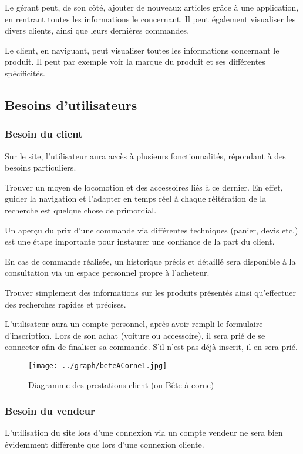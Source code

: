 \documentclass[a4paper]{article}
\begin{document}
	Le gérant peut, de son côté, ajouter de nouveaux articles grâce à une application, en rentrant toutes les informations le concernant. Il peut également visualiser les divers clients, ainsi que leurs dernières commandes. 

	Le client, en naviguant, peut visualiser toutes les informations concernant le produit. Il peut par exemple voir la marque du produit et ses différentes spécificités.
	\subsection{Besoins d'utilisateurs}
		\subsubsection{Besoin du client}
	Sur le site, l'utilisateur aura accès à plusieurs fonctionnalités, répondant à des besoins particuliers.
	
	Trouver un moyen de locomotion et des accessoires liés à ce dernier.
	En effet, guider la navigation et l'adapter en temps réel à chaque réitération de la recherche est quelque chose de primordial. 
	
	Un aperçu du prix d'une commande via différentes techniques (panier, devis etc.) est une étape importante pour instaurer une confiance de la part du client.
	
	En cas de commande réalisée, un historique précis et détaillé sera disponible à la consultation via un espace personnel propre à l'acheteur.
	
	Trouver simplement des informations sur les produits présentés ainsi qu'effectuer des recherches rapides et précises. 
	
	L'utilisateur aura un compte personnel, après avoir rempli le formulaire d'inscription. Lors de son achat (voiture ou accessoire), il sera prié de se connecter afin de finaliser sa commande. S'il n'est pas déjà inscrit, il en sera prié.
	
		\begin{figure}[t]
		\centering
			\texttt{[image: ../graph/beteACorne1.jpg]}
			\caption{Diagramme des prestations client (ou Bête à corne)}
	\end{figure}
		\newpage
		\subsubsection{Besoin du vendeur}
		L'utilisation du site lors d'une connexion via un compte vendeur ne sera bien évidemment différente que lors d'une connexion cliente.
		
\end{document}
